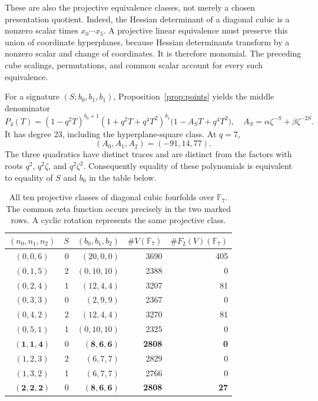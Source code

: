 \documentclass[11pt]{article}
\theoremstyle{remark}\newtheorem{remark}[theorem]{Remark}
\newcommand{\F}{\mathbb F}\newcommand{\PP}{\mathbb P}\newcommand{\Z}{\mathbb Z}
\begin{document}
These are also the projective equivalence classes, not merely a chosen presentation quotient. Indeed, the Hessian determinant of a diagonal cubic is a nonzero scalar times $x_0\cdots x_5$. A projective linear equivalence must preserve this union of coordinate hyperplanes, because Hessian determinants transform by a nonzero scalar and change of coordinates. It is therefore monomial. The preceding cube scalings, permutations, and common scalar account for every such equivalence.

For a signature $(S;b_0,b_1,b_1)$, Proposition~\ref{prop:points} yields the middle denominator
\begin{equation}\label{eq:generalP4}
P_4(T)=(1-q^2T)^{b_0+1}(1+q^2T+q^4T^2)^{b_1}
\bigl(1-A_ST+q^4T^2\bigr),
\quad A_S=\alpha\zeta^{-S}+\beta\zeta^{-2S}.
\end{equation}
It has degree 23, including the hyperplane-square class. At $q=7$,
\[
(A_0,A_1,A_2)=(-91,14,77).
\]
The three quadratics have distinct traces and are distinct from the factors with roots $q^2$, $q^2\zeta$, and $q^2\zeta^2$. Consequently equality of these polynomials is equivalent to equality of $S$ and $b_0$ in the table below.

\begin{table}[ht]\centering
\caption{All ten projective classes of diagonal cubic fourfolds over $\F_7$. The common zeta function occurs precisely in the two marked rows. A cyclic rotation represents the same projective class.}\label{tab:census}
\begin{tabular}{crrrr}\toprule
$(n_0,n_1,n_2)$&$S$&$(b_0,b_1,b_2)$&$\#V(\F_7)$&$\#F_2(V)(\F_7)$\\\midrule
$(0,0,6)$&0&$(20,0,0)$&3690&405\\
$(0,1,5)$&2&$(0,10,10)$&2388&0\\
$(0,2,4)$&1&$(12,4,4)$&3207&81\\
$(0,3,3)$&0&$(2,9,9)$&2367&0\\
$(0,4,2)$&2&$(12,4,4)$&3270&81\\
$(0,5,1)$&1&$(0,10,10)$&2325&0\\
$\boldsymbol{(1,1,4)}$&0&$\boldsymbol{(8,6,6)}$&\textbf{2808}&\textbf{0}\\
$(1,2,3)$&2&$(6,7,7)$&2829&0\\
$(1,3,2)$&1&$(6,7,7)$&2766&0\\
$\boldsymbol{(2,2,2)}$&0&$\boldsymbol{(8,6,6)}$&\textbf{2808}&\textbf{27}\\\bottomrule
\end{tabular}
\end{table}
\end{document}

